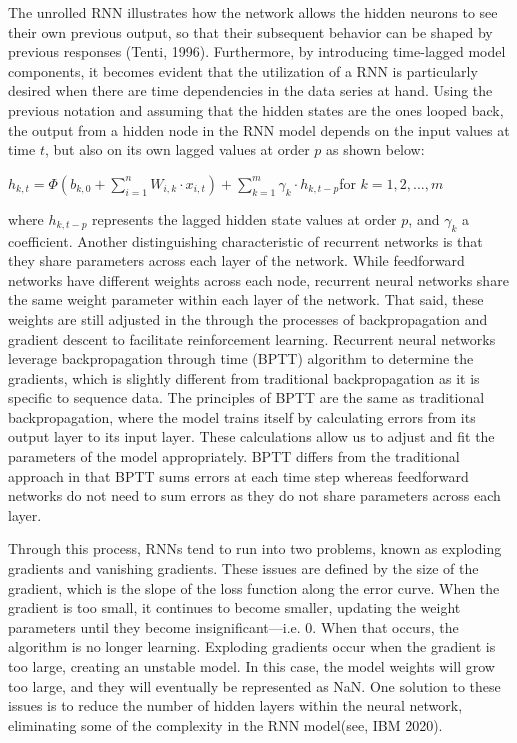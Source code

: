 \documentclass[a4paper,11pt,oneside]{book}
\begin{document}
The unrolled RNN illustrates how the network allows the hidden neurons to see their
own previous output, so that their subsequent behavior can be shaped by previous
responses (Tenti, 1996). Furthermore, by introducing time-lagged model components,
it becomes evident that the utilization of a RNN is particularly desired when there are
time dependencies in the data series at hand.
Using the previous notation and assuming that the hidden states are the ones looped
back, the output from a hidden node in the RNN model depends on the input values at
time $t$, but also on its own lagged values at order $p$ as shown below:

\begin{center}
	$h_{k,t} =\Phi(b_{k,0} + \sum_{i=1}^{n} W_{i,k} \cdot x_{i,t}) + \sum_{k=1}^{m} \gamma_{k} \cdot h_{k,t-p}$for $k = 1,2,...,m$
\end{center}

where $h_{k,t-p}$ represents the lagged hidden state values at order $p$, and $\gamma_{k}$ a coefficient. Another distinguishing characteristic of recurrent networks is that they share parameters across each layer of the network. While feedforward networks have different weights across each node, recurrent neural networks share the same weight parameter within each layer of the network. That said, these weights are still adjusted in the through the processes of backpropagation and gradient descent to facilitate reinforcement learning. Recurrent neural networks leverage backpropagation through time (BPTT) algorithm to determine the gradients, which is slightly different from traditional backpropagation as it is specific to sequence data. The principles of BPTT are the same as traditional backpropagation, where the model trains itself by calculating errors from its output layer to its input layer. These calculations allow us to adjust and fit the parameters of the model appropriately. BPTT differs from the traditional approach in that BPTT sums errors at each time step whereas feedforward networks do not need to sum errors as they do not share parameters across each layer.\newline\newline

Through this process, RNNs tend to run into two problems, known as exploding gradients and vanishing gradients. These issues are defined by the size of the gradient, which is the slope of the loss function along the error curve. When the gradient is too small, it continues to become smaller, updating the weight parameters until they become insignificant—i.e. 0. When that occurs, the algorithm is no longer learning. Exploding gradients occur when the gradient is too large, creating an unstable model. In this case, the model weights will grow too large, and they will eventually be represented as NaN. One solution to these issues is to reduce the number of hidden layers within the neural network, eliminating some of the complexity in the RNN model(see, IBM 2020).
\end{document}
